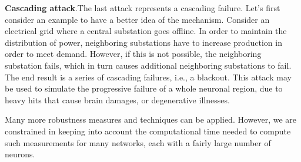 \vspace{\baselineskip}
\noindent \textbf{Cascading attack}.The last attack represents a cascading failure. Let's first consider an example to have a better idea of the mechanism. Consider an electrical grid where a central substation goes offline. In order to maintain the distribution of power, neighboring substations have to increase production in order to meet demand. However, if this is not possible, the neighboring substation fails, which in turn causes additional neighboring substations to fail. The end result is a series of cascading failures, i.e., a blackout.  
\newline This attack may be used to simulate the progressive failure of a whole neuronal region, due to heavy hits that cause brain damages, or degenerative illnesses.


Many more robustness measures and techniques can be applied. However, we are constrained in keeping into account the computational time needed to compute such measurements for many networks, each with a fairly large number of neurons.